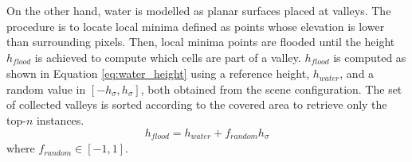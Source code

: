 On the other hand, water is modelled as planar surfaces placed at valleys. The procedure is to locate local minima defined as points whose elevation is lower than surrounding pixels. Then, local minima points are flooded until the height $h_{\textit{flood}}$ is achieved to compute which cells are part of a valley. $h_{\textit{flood}}$ is computed as shown in Equation \ref{eq:water_height} using a reference height, $h_{\textit{water}}$, and a random value in $[-h_{\sigma}, h_{\sigma}]$, both obtained from the scene configuration. The set of collected valleys is sorted according to the covered area to retrieve only the top-$n$ instances. 
\begin{equation}
    \label{eq:water_height}
    h_{\textit{flood}} = h_{\textit{water}} + f_{\textit{random}}h_{\sigma}
\end{equation}
where $f_{\textit{random}} \in [-1, 1]$.

